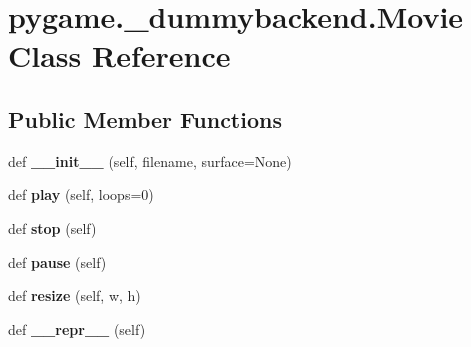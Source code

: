 \hypertarget{classpygame_1_1__dummybackend_1_1_movie}{}\section{pygame.\+\_\+dummybackend.\+Movie Class Reference}
\label{classpygame_1_1__dummybackend_1_1_movie}
\subsection*{Public Member Functions}
\begin{DoxyCompactItemize}
\item 
\mbox{\label{classpygame_1_1__dummybackend_1_1_movie_aa4fdb1cc9558f8e5a04992d4d819125e}} 
def {\bfseries \+\_\+\+\_\+init\+\_\+\+\_\+} (self, filename, surface=None)
\item 
\mbox{\label{classpygame_1_1__dummybackend_1_1_movie_a7908fc0a320e62891183dfbf4d639ff3}} 
def {\bfseries play} (self, loops=0)
\item 
\mbox{\label{classpygame_1_1__dummybackend_1_1_movie_a3eb9c779bb5964dfe66ac89cbaa17336}} 
def {\bfseries stop} (self)
\item 
\mbox{\label{classpygame_1_1__dummybackend_1_1_movie_a93b6d493ef63ec1fd966f8e3c4da71f6}} 
def {\bfseries pause} (self)
\item 
\mbox{\label{classpygame_1_1__dummybackend_1_1_movie_a5c434e0ac6a6a0868292399840685f18}} 
def {\bfseries resize} (self, w, h)
\item 
\mbox{\label{classpygame_1_1__dummybackend_1_1_movie_af6dc77e63d6fe51a2ccf44aa3fb7d5e8}} 
def {\bfseries \+\_\+\+\_\+repr\+\_\+\+\_\+} (self)
\end{DoxyCompactItemize}
